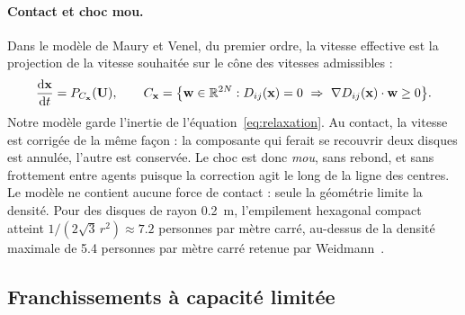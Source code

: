 \paragraph{Contact et choc mou.}
Dans le modèle de Maury et Venel, du premier ordre, la vitesse effective est la
projection de la vitesse souhaitée sur le cône des vitesses admissibles :
\[
\frac{\mathrm{d}\mathbf{x}}{\mathrm{d}t}=P_{C_{\mathbf{x}}}(\mathbf{U}),
\qquad
C_{\mathbf{x}}=\bigl\{\mathbf{w}\in\mathbb{R}^{2N} :
D_{ij}(\mathbf{x})=0\ \Rightarrow\ \nabla D_{ij}(\mathbf{x})\cdot\mathbf{w}\geq 0\bigr\}.
\]
Notre modèle garde l'inertie de l'équation~\eqref{eq:relaxation}. Au contact,
la vitesse est corrigée de la même façon : la composante qui ferait se
recouvrir deux disques est annulée, l'autre est conservée. Le choc est donc
\emph{mou}, sans rebond, et sans frottement entre agents puisque la correction
agit le long de la ligne des centres. Le modèle ne contient aucune force de
contact : seule la géométrie limite la densité. Pour des disques de rayon
\SI{0.2}{\metre}, l'empilement hexagonal compact atteint
$1/(2\sqrt{3}\,r^2)\approx\num{7.2}$ personnes par mètre carré, au-dessus de la
densité maximale de \num{5.4} personnes par mètre carré retenue par
Weidmann~\cite{weidmann1993}.

\subsection{Franchissements à capacité limitée}
\label{sec:franchissements}

